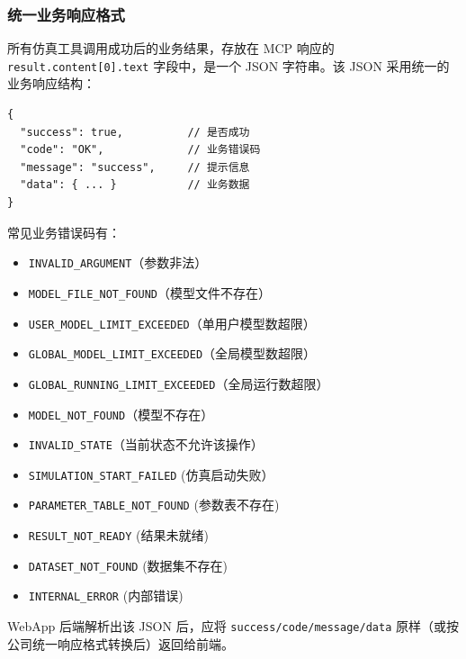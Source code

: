 
\subsubsection{统一业务响应格式}
所有仿真工具调用成功后的业务结果，存放在 MCP 响应的 \texttt{result.content[0].text} 字段中，是一个 JSON 字符串。该 JSON 采用统一的业务响应结构：
\begin{lstlisting}
{
  "success": true,          // 是否成功
  "code": "OK",             // 业务错误码
  "message": "success",     // 提示信息
  "data": { ... }           // 业务数据
}
\end{lstlisting}\vspace{-30pt}
常见业务错误码有：
\begin{itemize}
    \item\texttt{INVALID\_ARGUMENT}（参数非法）
    \item\texttt{MODEL\_FILE\_NOT\_FOUND}（模型文件不存在）
    \item\texttt{USER\_MODEL\_LIMIT\_EXCEEDED}（单用户模型数超限）
    \item\texttt{GLOBAL\_MODEL\_LIMIT\_EXCEEDED}（全局模型数超限）
    \item\texttt{GLOBAL\_RUNNING\_LIMIT\_EXCEEDED}（全局运行数超限）
    \item\texttt{MODEL\_NOT\_FOUND}（模型不存在）
    \item\texttt{INVALID\_STATE}（当前状态不允许该操作）
    \item\texttt{SIMULATION\_START\_FAILED} (仿真启动失败）
    \item\texttt{PARAMETER\_TABLE\_NOT\_FOUND} (参数表不存在)
    \item\texttt{RESULT\_NOT\_READY} (结果未就绪)
    \item\texttt{DATASET\_NOT\_FOUND} (数据集不存在)
    \item\texttt{INTERNAL\_ERROR} (内部错误)
\end{itemize}
    WebApp 后端解析出该 JSON 后，应将 \texttt{success/code/message/data} 原样（或按公司统一响应格式转换后）返回给前端。

